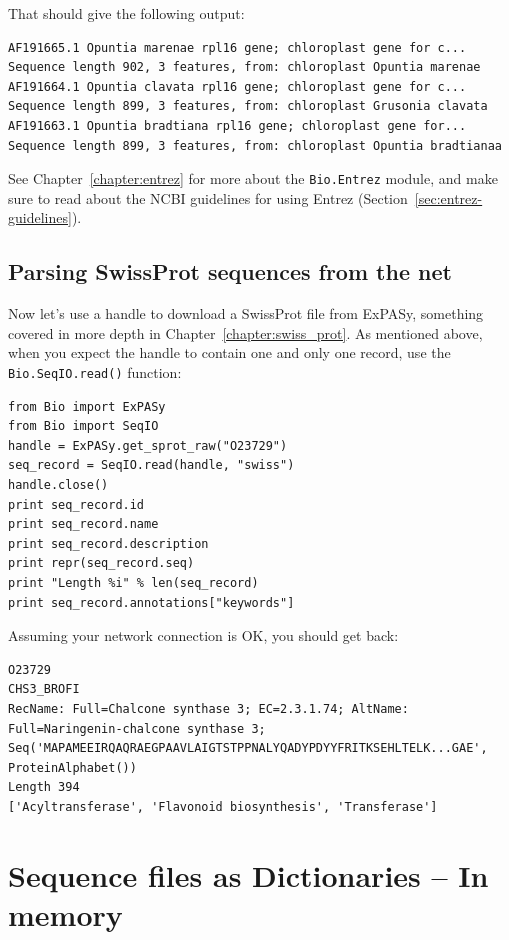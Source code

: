 \documentclass{report}
\begin{document}
\noindent That should give the following output:

\begin{verbatim}
AF191665.1 Opuntia marenae rpl16 gene; chloroplast gene for c...
Sequence length 902, 3 features, from: chloroplast Opuntia marenae
AF191664.1 Opuntia clavata rpl16 gene; chloroplast gene for c...
Sequence length 899, 3 features, from: chloroplast Grusonia clavata
AF191663.1 Opuntia bradtiana rpl16 gene; chloroplast gene for...
Sequence length 899, 3 features, from: chloroplast Opuntia bradtianaa
\end{verbatim}

See Chapter~\ref{chapter:entrez} for more about the \verb|Bio.Entrez| module, and make sure to read about the NCBI guidelines for using Entrez (Section~\ref{sec:entrez-guidelines}).

\subsection{Parsing SwissProt sequences from the net}
\label{sec:SeqIO_ExPASy_and_SwissProt}
Now let's use a handle to download a SwissProt file from ExPASy,
something covered in more depth in Chapter~\ref{chapter:swiss_prot}.
As mentioned above, when you expect the handle to contain one and only one record,
use the \verb|Bio.SeqIO.read()| function:

\begin{verbatim}
from Bio import ExPASy
from Bio import SeqIO
handle = ExPASy.get_sprot_raw("O23729")
seq_record = SeqIO.read(handle, "swiss")
handle.close()
print seq_record.id
print seq_record.name
print seq_record.description
print repr(seq_record.seq)
print "Length %i" % len(seq_record)
print seq_record.annotations["keywords"]
\end{verbatim}

\noindent Assuming your network connection is OK, you should get back:

\begin{verbatim}
O23729
CHS3_BROFI
RecName: Full=Chalcone synthase 3; EC=2.3.1.74; AltName: Full=Naringenin-chalcone synthase 3;
Seq('MAPAMEEIRQAQRAEGPAAVLAIGTSTPPNALYQADYPDYYFRITKSEHLTELK...GAE', ProteinAlphabet())
Length 394
['Acyltransferase', 'Flavonoid biosynthesis', 'Transferase']
\end{verbatim}

\section{Sequence files as Dictionaries -- In memory}
\label{SeqIO:to_dict}
\end{document}
